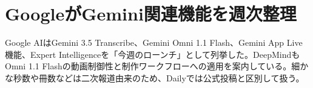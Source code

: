 \section{GoogleがGemini関連機能を週次整理}
Google AIはGemini 3.5 Transcribe、Gemini Omni 1.1 Flash、Gemini App Live機能、Expert Intelligenceを「今週のローンチ」として列挙した。DeepMindもOmni 1.1 Flashの動画制御性と制作ワークフローへの適用を案内している。細かな秒数や冊数などは二次報道由来のため、Dailyでは公式投稿と区別して扱う。
